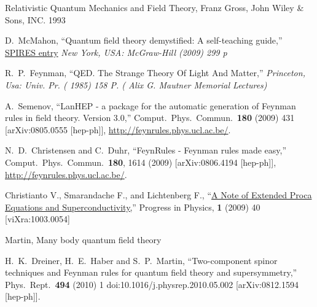 \begin{thebibliography}{99}
Relativistic Quantum Mechanics and Field Theory, Franz Gross, John Wiley \& Sons, INC. 1993

  D.~McMahon,
  ``Quantum field theory demystified: A self-teaching guide,''
  \href{http://www.slac.stanford.edu/spires/find/hep/www?irn=8432112}{SPIRES entry}
{\it  New York, USA: McGraw-Hill (2009) 299 p}

  R.~P.~Feynman,
  ``QED. The Strange Theory Of Light And Matter,''
{\it  Princeton, Usa: Univ. Pr. ( 1985) 158 P. ( Alix G. Mautner Memorial Lectures)}


  A.~Semenov,
  ``LanHEP - a package for the automatic generation of Feynman rules in field
  theory. Version 3.0,''
  Comput.\ Phys.\ Commun.\  {\bf 180} (2009) 431
  [arXiv:0805.0555 [hep-ph]], \url{http://feynrules.phys.ucl.ac.be/}.

  N.~D.~Christensen and C.~Duhr,
  ``FeynRules - Feynman rules made easy,''
  Comput.\ Phys.\ Commun.\  {\bf 180}, 1614 (2009)
  [arXiv:0806.4194 [hep-ph]],
   \url{http://feynrules.phys.ucl.ac.be/}.

  Christianto V., Smarandache F., and Lichtenberg F., 
  ``\href{http://www.ptep-online.com/index_files/2009/PP-16-08.PDF}{A Note of Extended Proca Equations and Superconductivity,}''
  Progress in Physics, \textbf{1} (2009) 40
  [viXra:1003.0054]

Martin, Many body quantum field theory

  H.~K.~Dreiner, H.~E.~Haber and S.~P.~Martin,
  ``Two-component spinor techniques and Feynman rules for quantum field theory and supersymmetry,''
  Phys.\ Rept.\  {\bf 494} (2010) 1
  doi:10.1016/j.physrep.2010.05.002
  [arXiv:0812.1594 [hep-ph]].

\end{thebibliography}
